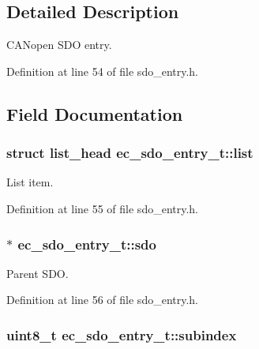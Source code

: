 \subsection{\-Detailed \-Description}
\-C\-A\-Nopen \-S\-D\-O entry. 

\-Definition at line 54 of file sdo\-\_\-entry.\-h.



\subsection{\-Field \-Documentation}
\subsubsection[{list}]{\setlength{\rightskip}{0pt plus 5cm}struct list\-\_\-head {\bf ec\-\_\-sdo\-\_\-entry\-\_\-t\-::list}}\label{structec__sdo__entry__t_a7ac0567e0a3b260803d3de36ddbc7a63}


\-List item. 



\-Definition at line 55 of file sdo\-\_\-entry.\-h.

\subsubsection[{sdo}]{$\ast$ {\bf ec\-\_\-sdo\-\_\-entry\-\_\-t\-::sdo}}\label{structec__sdo__entry__t_a191cd495d9a5b0b13af072f704b88733}


\-Parent \-S\-D\-O. 



\-Definition at line 56 of file sdo\-\_\-entry.\-h.

\subsubsection[{subindex}]{\setlength{\rightskip}{0pt plus 5cm}uint8\-\_\-t {\bf ec\-\_\-sdo\-\_\-entry\-\_\-t\-::subindex}}\label{structec__sdo__entry__t_a7411aa63d3e57ac816ecfbabdc9926c8}



